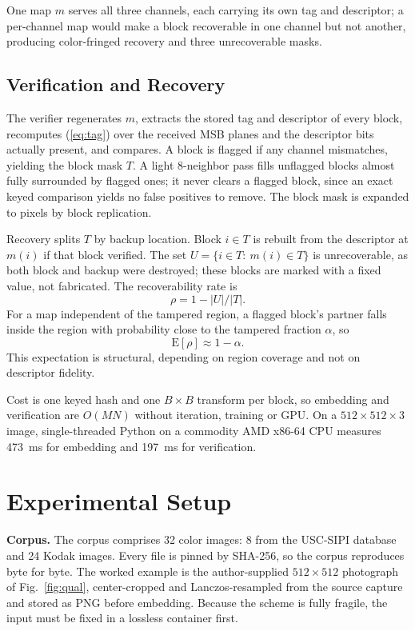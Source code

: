 \documentclass[conference]{IEEEtran}
\begin{document}
One map $m$ serves all three channels, each carrying its own tag and descriptor; a per-channel map would make a block recoverable in one channel but not another, producing color-fringed recovery and three unrecoverable masks.

\subsection{Verification and Recovery}
\label{ssec:verify}
The verifier regenerates $m$, extracts the stored tag and descriptor of every block, recomputes (\ref{eq:tag}) over the received MSB planes and the descriptor bits actually present, and compares. A block is flagged if any channel mismatches, yielding the block mask $T$. A light 8-neighbor pass fills unflagged blocks almost fully surrounded by flagged ones; it never clears a flagged block, since an exact keyed comparison yields no false positives to remove. The block mask is expanded to pixels by block replication.

Recovery splits $T$ by backup location. Block $i\in T$ is rebuilt from the descriptor at $m(i)$ if that block verified. The set $U=\{i\in T:\ m(i)\in T\}$ is unrecoverable, as both block and backup were destroyed; these blocks are marked with a fixed value, not fabricated. The recoverability rate is
\begin{equation}
\rho=1-|U|/|T|.
\label{eq:rho}
\end{equation}
For a map independent of the tampered region, a flagged block's partner falls inside the region with probability close to the tampered fraction $\alpha$, so
\begin{equation}
\mathrm{E}[\rho]\approx 1-\alpha.
\label{eq:bound}
\end{equation}
This expectation is structural, depending on region coverage and not on descriptor fidelity.

Cost is one keyed hash and one $B\times B$ transform per block, so embedding and verification are $O(MN)$ without iteration, training or GPU. On a $512\times512\times3$ image, single-threaded Python on a commodity AMD x86-64 CPU measures 473~ms for embedding and 197~ms for verification.

\section{Experimental Setup}
\label{sec:setup}

\textbf{Corpus.} The corpus comprises 32 color images: 8 from the USC-SIPI database \cite{uscsipi} and 24 Kodak images. Every file is pinned by SHA-256, so the corpus reproduces byte for byte. The worked example is the author-supplied $512\times512$ photograph of Fig.~\ref{fig:qual}, center-cropped and Lanczos-resampled from the source capture and stored as PNG before embedding. Because the scheme is fully fragile, the input must be fixed in a lossless container first.
\end{document}
